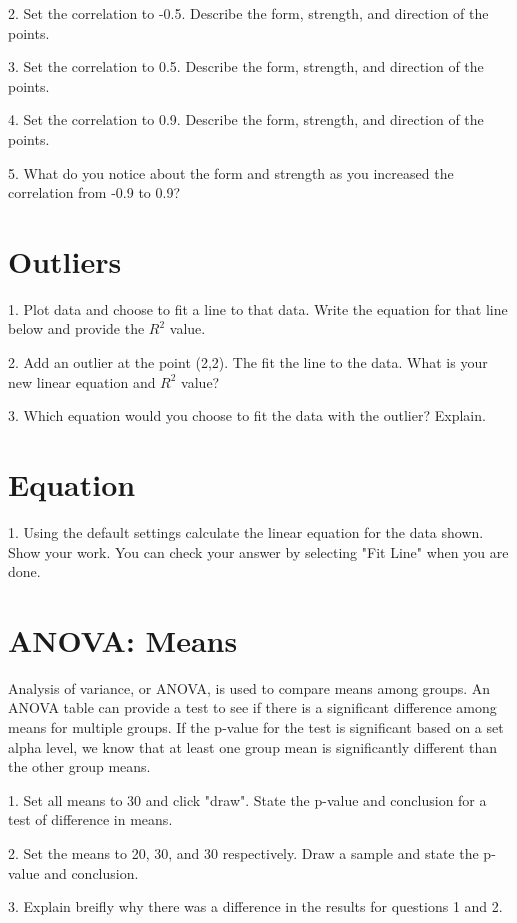\documentclass[11pt]{amsart}
\begin{document}
2. Set the correlation to -0.5. Describe the form, strength, and direction of the points.

3. Set the correlation to 0.5. Describe the form, strength, and direction of the points.

4. Set the correlation to 0.9. Describe the form, strength, and direction of the points.

5. What do you notice about the form and strength as you increased the correlation from -0.9 to 0.9?

\section{Outliers}

1. Plot data and choose to fit a line to that data. Write the equation for that line below and provide the $R^2$ value. 

2. Add an outlier at the point (2,2). The fit the line to the data. What is your new linear equation and $R^2$ value?

3. Which equation would you choose to fit the data with the outlier? Explain.


\section{Equation}

1. Using the default settings calculate the linear equation for the data shown. Show your work. You can check your answer by selecting "Fit Line" when you are done. 


\section{ANOVA: Means}
Analysis of variance, or ANOVA, is used to compare means among groups.  An ANOVA table can provide a test to see if there is a significant difference among means for multiple groups. If the p-value for the test is significant based on a set alpha level, we know that at least one group mean is significantly different than the other group means.

1. Set all means to 30 and click "draw".  State the p-value and conclusion for a test of difference in means.

2.  Set the means to 20, 30, and 30 respectively.  Draw a sample and state the p-value and conclusion.

3. Explain breifly why there was a difference in the results for questions 1 and 2. 
\end{document}
